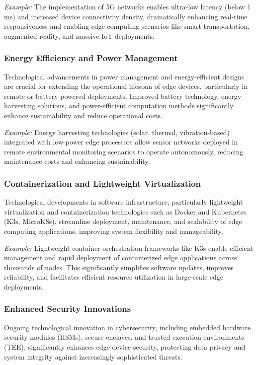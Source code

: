 \documentclass[runningheads]{llncs}
\begin{document}
\textit{Example:} The implementation of 5G networks enables ultra-low latency (below 1 ms) and increased device connectivity density, dramatically enhancing real-time responsiveness and enabling edge computing scenarios like smart transportation, augmented reality, and massive IoT deployments.

\subsubsection{Energy Efficiency and Power Management}
Technological advancements in power management and energy-efficient designs are crucial for extending the operational lifespan of edge devices, particularly in remote or battery-powered deployments. Improved battery technology, energy harvesting solutions, and power-efficient computation methods significantly enhance sustainability and reduce operational costs.

\textit{Example:} Energy harvesting technologies (solar, thermal, vibration-based) integrated with low-power edge processors allow sensor networks deployed in remote environmental monitoring scenarios to operate autonomously, reducing maintenance costs and enhancing sustainability.

\subsubsection{Containerization and Lightweight Virtualization}
Technological developments in software infrastructure, particularly lightweight virtualization and containerization technologies such as Docker and Kubernetes (K3s, MicroK8s), streamline deployment, maintenance, and scalability of edge computing applications, improving system flexibility and manageability.

\textit{Example:} Lightweight container orchestration frameworks like K3s enable efficient management and rapid deployment of containerized edge applications across thousands of nodes. This significantly simplifies software updates, improves reliability, and facilitates efficient resource utilization in large-scale edge deployments.

\subsubsection{Enhanced Security Innovations}
Ongoing technological innovation in cybersecurity, including embedded hardware security modules (HSMs), secure enclaves, and trusted execution environments (TEE), significantly enhances edge device security, protecting data privacy and system integrity against increasingly sophisticated threats.
\end{document}
